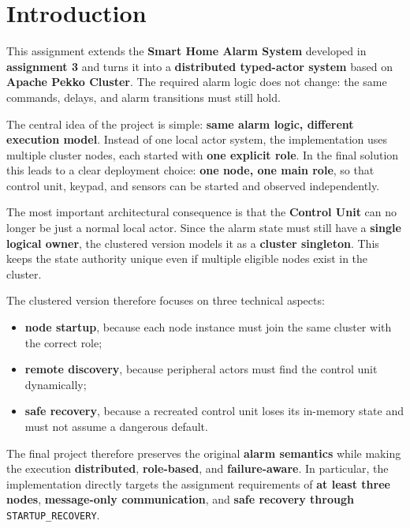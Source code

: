 \clearpage
\section{Introduction}

This assignment extends the \textbf{Smart Home Alarm System} developed in
\textbf{assignment 3} and turns it into a \textbf{distributed typed-actor system}
based on \textbf{Apache Pekko Cluster}. The required alarm logic does not
change: the same commands, delays, and alarm transitions must still hold.

The central idea of the project is simple: \textbf{same alarm logic, different
execution model}. Instead of one local actor system, the implementation uses
multiple cluster nodes, each started with \textbf{one explicit role}. In the
final solution this leads to a clear deployment choice: \textbf{one node, one
main role}, so that control unit, keypad, and sensors can be started and
observed independently.

The most important architectural consequence is that the \textbf{Control Unit}
can no longer be just a normal local actor. Since the alarm state must still
have a \textbf{single logical owner}, the clustered version models it as a
\textbf{cluster singleton}. This keeps the state authority unique even if
multiple eligible nodes exist in the cluster.

The clustered version therefore focuses on three technical aspects:
\begin{itemize}
    \item \textbf{node startup}, because each node instance must join the same cluster with the correct role;
    \item \textbf{remote discovery}, because peripheral actors must find the control unit dynamically;
    \item \textbf{safe recovery}, because a recreated control unit loses its in-memory state and must not assume a dangerous default.
\end{itemize}

The final project therefore preserves the original \textbf{alarm semantics} while
making the execution \textbf{distributed}, \textbf{role-based}, and
\textbf{failure-aware}. In particular, the implementation directly targets the
assignment requirements of \textbf{at least three nodes}, \textbf{message-only
communication}, and \textbf{safe recovery through}
\texttt{STARTUP\_RECOVERY}.
